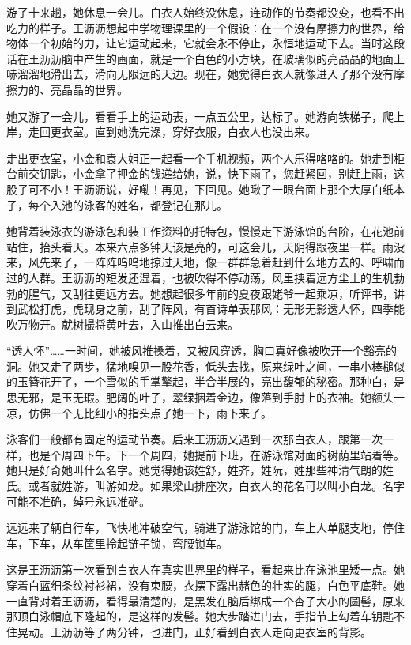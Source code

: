 \documentclass[lang=cn,newtx,12pt,scheme=chinese]{elegantbook}
\begin{document}
游了十来趟，她休息一会儿。白衣人始终没休息，连动作的节奏都没变，也看不出吃力的样子。王沥沥想起中学物理课里的一个假设：在一个没有摩擦力的世界，给物体一个初始的力，让它运动起来，它就会永不停止，永恒地运动下去。当时这段话在王沥沥脑中产生的画面，就是一个白色的小方块，在玻璃似的亮晶晶的地面上哧溜溜地滑出去，滑向无限远的天边。现在，她觉得白衣人就像进入了那个没有摩擦力的、亮晶晶的世界。

她又游了一会儿，看看手上的运动表，一点五公里，达标了。她游向铁梯子，爬上岸，走回更衣室。直到她洗完澡，穿好衣服，白衣人也没出来。

走出更衣室，小金和袁大姐正一起看一个手机视频，两个人乐得咯咯的。她走到柜台前交钥匙，小金拿了押金的钱递给她，说，快下雨了，您赶紧回，别赶上雨，这股子可不小！王沥沥说，好嘞！再见，下回见。她瞅了一眼台面上那个大厚白纸本子，每个入池的泳客的姓名，都登记在那儿。

她背着装泳衣的游泳包和装工作资料的托特包，慢慢走下游泳馆的台阶，在花池前站住，抬头看天。本来六点多钟天该是亮的，可这会儿，天阴得跟夜里一样。雨没来，风先来了，一阵阵呜呜地掠过天地，像一群群急着赶到什么地方去的、呼啸而过的人群。王沥沥的短发还湿着，也被吹得不停动荡，风里挟着远方尘土的生机勃勃的腥气，又刮往更远方去。她想起很多年前的夏夜跟姥爷一起乘凉，听评书，讲到武松打虎，虎现身之前，刮了阵风，有首诗单表那风：无形无影透人怀，四季能吹万物开。就树撮将黄叶去，入山推出白云来。

“透人怀”……一时间，她被风推搡着，又被风穿透，胸口真好像被吹开一个豁亮的洞。她又走了两步，猛地嗅见一股花香，低头去找，原来绿叶之间，一串小棒槌似的玉簪花开了，一个雪似的手掌擎起，半合半展的，亮出馥郁的秘密。那种白，是思无邪，是玉无瑕。肥阔的叶子，翠绿捆着金边，像落到手肘上的衣袖。她额头一凉，仿佛一个无比细小的指头点了她一下，雨下来了。

泳客们一般都有固定的运动节奏。后来王沥沥又遇到一次那白衣人，跟第一次一样，也是个周四下午。下一个周四，她提前下班，在游泳馆对面的树荫里站着等。她只是好奇她叫什么名字。她觉得她该姓舒，姓齐，姓阮，姓那些神清气朗的姓氏。或者就姓游，叫游如龙。如果梁山排座次，白衣人的花名可以叫小白龙。名字可能不准确，绰号永远准确。

远远来了辆自行车，飞快地冲破空气，骑进了游泳馆的门，车上人单腿支地，停住车，下车，从车筐里拎起链子锁，弯腰锁车。

这是王沥沥第一次看到白衣人在真实世界里的样子，看起来比在泳池里矮一点。她穿着白蓝细条纹衬衫裙，没有束腰，衣摆下露出赭色的壮实的腿，白色平底鞋。她一直背对着王沥沥，看得最清楚的，是黑发在脑后绑成一个杏子大小的圆髻，原来那顶白泳帽底下隆起的，是这样的发髻。她大步踏进门去，手指节上勾着车钥匙不住晃动。王沥沥等了两分钟，也进门，正好看到白衣人走向更衣室的背影。
\end{document}
